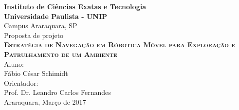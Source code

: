 \begin{titlepage}
  \centering
  \Large
  \textbf{Instituto de Ciências Exatas e Tecnologia \\ 
  			Universidade Paulista - UNIP}\\
  Campus Araraquara, SP\\[2em]
  
  Proposta de projeto\\[7em]
  \textsc{\textbf{\fontsize{17}{\baselineskip}\selectfont Estratégia de Navegação em Róbotica Móvel para Exploração e Patrulhamento de um Ambiente}}\\[7em]

  Aluno: \\ Fábio César Schimidt \\[2em]
  Orientador: \\ Prof. Dr. Leandro Carlos Fernandes\\[9em]
  Araraquara, Março de 2017
\end{titlepage}